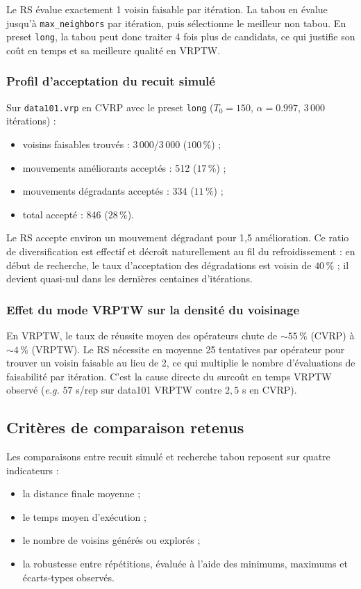 \documentclass[11pt,a4paper]{article}
\begin{document}
Le RS évalue exactement 1 voisin faisable par itération. La tabou en évalue jusqu'à \texttt{max\_neighbors} par itération, puis sélectionne le meilleur non tabou. En preset \texttt{long}, la tabou peut donc traiter 4 fois plus de candidats, ce qui justifie son coût en temps et sa meilleure qualité en VRPTW.

\subsubsection*{Profil d'acceptation du recuit simulé}

Sur \texttt{data101.vrp} en CVRP avec le preset \texttt{long} ($T_0=150$, $\alpha=0.997$, 3\,000 itérations) :
\begin{itemize}
    \item voisins faisables trouvés : 3\,000/3\,000 ($100\,\%$) ;
    \item mouvements améliorants acceptés : 512 ($17\,\%$) ;
    \item mouvements dégradants acceptés : 334 ($11\,\%$) ;
    \item total accepté : 846 ($28\,\%$).
\end{itemize}

Le RS accepte environ un mouvement dégradant pour 1,5 amélioration. Ce ratio de diversification est effectif et décroît naturellement au fil du refroidissement : en début de recherche, le taux d'acceptation des dégradations est voisin de $40\,\%$ ; il devient quasi-nul dans les dernières centaines d'itérations.

\subsubsection*{Effet du mode VRPTW sur la densité du voisinage}

En VRPTW, le taux de réussite moyen des opérateurs chute de $\sim 55\,\%$ (CVRP) à $\sim 4\,\%$ (VRPTW). Le RS nécessite en moyenne 25 tentatives par opérateur pour trouver un voisin faisable au lieu de 2, ce qui multiplie le nombre d'évaluations de faisabilité par itération. C'est la cause directe du surcoût en temps VRPTW observé (\textit{e.g.} $57$ s/rep sur data101 VRPTW contre $2{,}5$ s en CVRP).

\subsection{Critères de comparaison retenus}
Les comparaisons entre recuit simulé et recherche tabou reposent sur quatre indicateurs :
\begin{itemize}
    \item la distance finale moyenne ;
    \item le temps moyen d'exécution ;
    \item le nombre de voisins générés ou explorés ;
    \item la robustesse entre répétitions, évaluée à l'aide des minimums, maximums et écarts-types observés.
\end{itemize}
\end{document}
